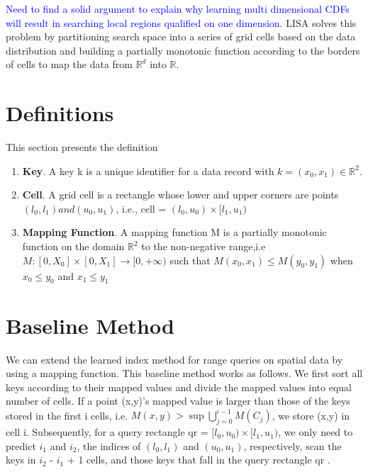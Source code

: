 \textcolor{blue} {Need to find a solid argument to explain why learning multi dimensional CDFs will result in  searching local regions qualified on one dimension. }
LISA solves this problem by partitioning search space into a series of grid cells based on the data distribution and building a partially monotonic function according to the borders of cells to map the data from $\mathbb{R}^d$ into $\mathbb{R}$.

\section{Definitions}

This section presents the definition

\begin{enumerate}
	\item \textbf{Key}. A key k is a unique identifier for a data record with $k = (x_{0}, x_{1}) \in \mathbb{R}^{2}$. 
    
	\item \textbf{Cell}. A grid cell is a rectangle whose lower and upper corners are points $(l_{0},l_{1}) and  (u_{0},u_{1})$, i.e.,  cell = $(l_{0},u_{0}) \times [l_{1},u_{1})$
	
	\item \textbf{Mapping Function}. A mapping function M is a partially monotonic function on the domain $\mathbb{R}^{2}$ to the non-negative range,i.e $M:[0,X_{0}]\times[0,X_{1}]\to [0,+\infty)$ such that $M(x_{0},x_{1}) \leq M(y_{0},y_{1})$ when $x_{0} \leq y_{0}$ and $x_{1} \leq y_{1} $
    
\end{enumerate}
\section{Baseline Method}  

We can extend the learned index method for range queries on spatial data by using a mapping function. This baseline method works as follows. We first sort all keys according to their mapped values and divide the mapped values into equal number of cells. If a point
(x,y)’s mapped value is larger than those of the keys stored
in the first i cells, i.e. $M(x,y) > \sup \bigcup\limits_{j=0}^{i-1} M(C_{j})$, we store (x,y) in cell i. Subsequently, for a query rectangle
qr = $[l_{0},u_{0}) \times [l_{1},u_{1})$, we only need to predict $i_{1}$ and $i_{2}$, the indices of $(l_{0}, l_{1})$ and $(u_{0},u_{1})$, respectively, scan the keys in $i_{2}$ - $i_{1}$ + 1 cells, and those keys that fall in the query rectangle qr . 


